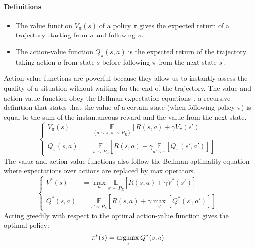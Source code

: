 \begin{tcolorbox}
\small
\paragraph{Definitions}
\begin{itemize}[noitemsep]
	 \item The \gls{value function} $V_\pi(s)$ of a policy $\pi$ gives the expected return of a trajectory starting from $s$ and following $\pi$. 
	 \item The \gls{action-value function} $Q_\pi(s,a)$ is the expected return of the trajectory taking action $a$ from state $s$ before following $\pi$ from the next state $s'$. 
\end{itemize}
\end{tcolorbox}
Action-value functions are powerful because they allow us to instantly assess the quality of a situation without waiting for the end of the trajectory. The value and action-value function obey the Bellman expectation equations~\citep{sutton1998intra}, a recursive definition that states that the value of a certain state (when following policy $\pi$) is equal to the sum of the instantaneous reward and the value from the next state.
\begin{equation}
\left\{
\begin{split}
	V_\pi(s) & = \underset{(a\sim\pi, s'\sim P_E)}{\mathbb{E}}\left[R(s,a) + \gamma V_\pi(s')\right]  \\
	Q_\pi(s,a) &= \underset{s'\sim P_E}{\mathbb{E}}\left[ R(s,a) + \gamma \underset{a' \sim \pi}{\mathbb{E}}[Q_\pi(s',a')]\right]
\end{split}
\right.	
\end{equation}
The value and action-value functions also follow the Bellman optimality equation where expectations over actions are replaced by max operators.
\begin{equation}
\left\{
\begin{split}
	V^*(s) & = \max_a\underset{s'\sim P_E}{\mathbb{E}}\left[R(s,a) + \gamma V^*(s')\right]  \\
	Q^*(s,a) &= \underset{s'\sim P_E}{\mathbb{E}}\left[ R(s,a) + \gamma \max_{a'}[Q^*(s',a')]\right]
\end{split}
\right.	
\end{equation}
Acting greedily with respect to the optimal action-value function gives the optimal policy:
\begin{equation}
\pi^*(s) = \operatorname*{argmax}_a Q^*(s,a)	
\end{equation}


